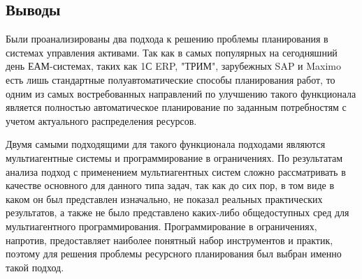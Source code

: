 \subsection{Выводы}

Были проанализированы два подхода к решению проблемы планирования в системах управления активами. Так как в самых популярных на сегодняшний день ЕАМ-системах, таких как 1С ERP, "ТРИМ", зарубежных SAP и Maximo есть лишь стандартные полуавтоматические способы планирования работ, то одним из самых востребованных направлений по улучшению такого функционала является полностью автоматическое планирование по заданным потребностям с учетом актуального распределения ресурсов.

Двумя самыми подходящими для такого функционала подходами являются мультиагентные системы и программирование в ограничениях. По результатам анализа подход с применением мультиагентных систем сложно рассматривать в качестве основного для данного типа задач, так как до сих пор, в том виде в каком он был представлен изначально, не показал реальных практических результатов, а также не было представлено каких-либо общедоступных сред для мультиагентного программирования. Программирование в ограничениях, напротив, предоставляет наиболее понятный набор инструментов и практик, поэтому для решения проблемы ресурсного планирования был выбран именно такой подход.


\clearpage
